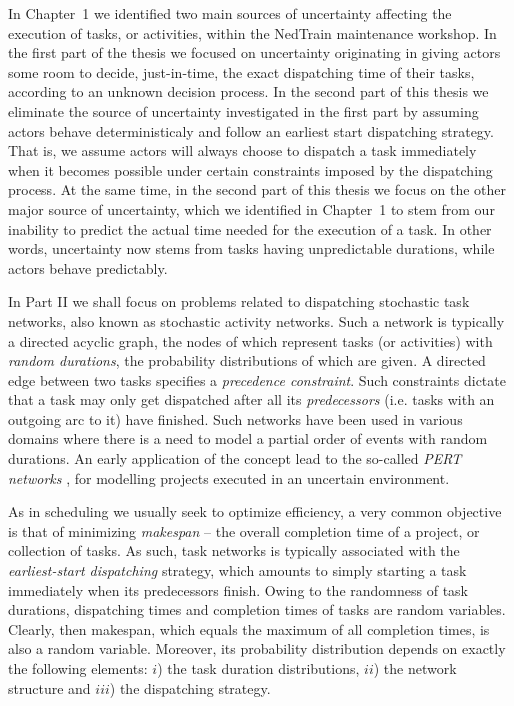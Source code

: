 	In Chapter~1 we identified two main sources of uncertainty affecting the execution of tasks, or activities, within the NedTrain maintenance workshop.
	In the first part of the thesis we focused on uncertainty originating in giving actors some room to decide, just-in-time, the exact dispatching time of their tasks,
	according to an unknown decision process.
	In the second part of this thesis we eliminate the source of uncertainty investigated in the first part
	by assuming actors behave deterministicaly and follow an earliest start dispatching strategy.
	That is, we assume actors will always choose to dispatch a task immediately when it becomes possible under certain constraints imposed by the dispatching process. 
	At the same time, in the second part of this thesis we focus on the other major source of uncertainty,
	which we identified in Chapter~1 to stem from our inability to predict the actual time needed for the execution of a task.
	In other words, uncertainty now stems from tasks having unpredictable durations, while actors behave predictably. 

	In Part II we shall focus on problems related to dispatching stochastic task networks, also known as stochastic activity networks.
	Such a network is typically a directed acyclic graph, the nodes of which represent tasks (or activities) with \emph{random durations}, the probability distributions of which are given.
	A directed edge between two tasks specifies a \emph{precedence constraint}. 
	Such constraints dictate that a task may only get dispatched after all its \emph{predecessors} (i.e. tasks with an outgoing arc to it) have finished.
	Such networks have been used in various domains where there is a need to model a partial order of events with random durations.
	An early application of the concept lead to the so-called \emph{PERT networks} \cite{malcolm1959}, 
	for modelling projects executed in an uncertain environment.

	As in scheduling we usually seek to optimize efficiency, 
	a very common objective is that of minimizing \emph{makespan} -- the overall completion time of a project, or collection of tasks.
	As such, task networks is typically associated with the \emph{earliest-start dispatching} strategy,
	which amounts to simply starting a task immediately when its predecessors finish.
	Owing to the randomness of task durations,
	dispatching times and completion times of tasks are random variables.
	Clearly, then makespan, which equals the maximum of all completion times, is also a random variable.
	Moreover, its probability distribution depends on exactly the following elements:
	$i$) the task duration distributions, 
	$ii$) the network structure and $iii$) the dispatching strategy.

